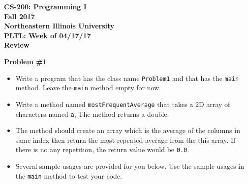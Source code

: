 \documentclass[12pt]{article}
\begin{document}
\begin{center}
	\textbf{CS-200: Programming I}\\
	\textbf{Fall 2017}\\
	\textbf{Northeastern Illinois University}\\
	\textbf{PLTL: Week of 04/17/17}\\
	\textbf{Review}
\end{center}


\noindent\underline{\textbf{Problem \#1}}
\begin{itemize}
	\item Write a program that has the class name \texttt{Problem1} and that has the \texttt{main} method. Leave the \texttt{main} method empty for now.
	\item Write a method named \texttt{mostFrequentAverage} that takes a 2D array of characters named \texttt{a},  The method returns a double.
	\item The method should create an array which is the average of the columns in same index then return the most repeated average from the this array. If there is no any repetition, the return value would be \texttt{0.0}.
	\item Several sample usages are provided for you below. Use the sample usages in the \texttt{main} method to test your code.
\end{itemize}
\end{document}
